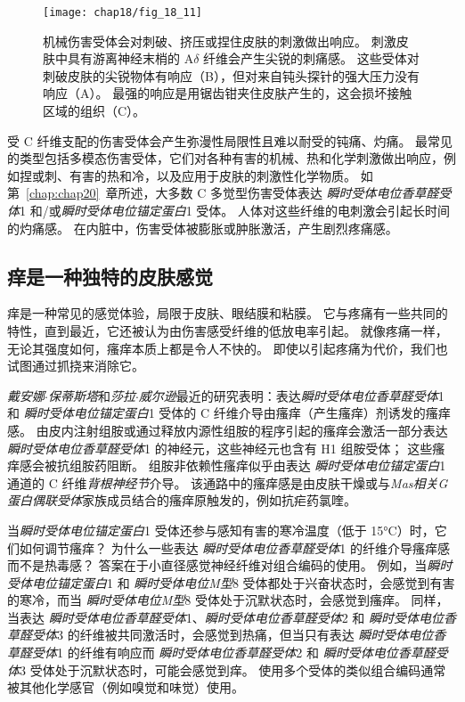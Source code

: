 \begin{figure}[htbp]
	\centering
	\texttt{[image: chap18/fig\_18\_11]}
	\caption{机械伤害受体会对刺破、挤压或捏住皮肤的刺激做出响应。
		刺激皮肤中具有游离神经末梢的 A$\delta$ 纤维会产生尖锐的刺痛感。
		这些受体对刺破皮肤的尖锐物体有响应（B），但对来自钝头探针的强大压力没有响应（A）。
		最强的响应是用锯齿钳夹住皮肤产生的，这会损坏接触区域的组织（C）\cite{perl1968myelinated}。}
	\label{fig:18_11}
\end{figure}


受 C 纤维支配的伤害受体会产生弥漫性局限性且难以耐受的钝痛、灼痛。
最常见的类型包括多模态伤害受体，它们对各种有害的机械、热和化学刺激做出响应，例如捏或刺、有害的热和冷，以及应用于皮肤的刺激性化学物质。
如第~\ref{chap:chap20}~章所述，大多数 C 多觉型伤害受体表达 \textit{瞬时受体电位香草醛受体}1 和/或\textit{瞬时受体电位锚定蛋白}1 受体。
人体对这些纤维的电刺激会引起长时间的灼痛感。
在内脏中，伤害受体被膨胀或肿胀激活，产生剧烈疼痛感。


\subsection{痒是一种独特的皮肤感觉}

痒是一种常见的感觉体验，局限于皮肤、眼结膜和粘膜。 
它与疼痛有一些共同的特性，直到最近，它还被认为由伤害感受纤维的低放电率引起。
就像疼痛一样，无论其强度如何，瘙痒本质上都是令人不快的。
即使以引起疼痛为代价，我们也试图通过抓挠来消除它。


\textit{戴安娜$\cdot$保蒂斯塔}和\textit{莎拉$\cdot$威尔逊}最近的研究表明：表达\textit{瞬时受体电位香草醛受体}1 和 \textit{瞬时受体电位锚定蛋白}1 受体的 C 纤维介导由瘙痒（产生瘙痒）剂诱发的瘙痒感。
由皮内注射组胺或通过释放内源性组胺的程序引起的瘙痒会激活一部分表达 \textit{瞬时受体电位香草醛受体}1 的神经元，这些神经元也含有 H1 组胺受体；
这些瘙痒感会被抗组胺药阻断。
组胺非依赖性瘙痒似乎由表达 \textit{瞬时受体电位锚定蛋白}1 通道的 C 纤维\textit{背根神经节}介导。
该通路中的瘙痒感是由皮肤干燥或与\textit{Mas相关G蛋白偶联受体}家族成员结合的瘙痒原触发的，例如抗疟药氯喹。


当\textit{瞬时受体电位锚定蛋白}1 受体还参与感知有害的寒冷温度（低于 15°C）时，它们如何调节瘙痒？
为什么一些表达 \textit{瞬时受体电位香草醛受体}1 的纤维介导瘙痒感而不是热毒感？
答案在于小直径感觉神经纤维对组合编码的使用。
例如，当\textit{瞬时受体电位锚定蛋白}1 和 \textit{瞬时受体电位M型}8 受体都处于兴奋状态时，会感觉到有害的寒冷，而当 \textit{瞬时受体电位M型}8 受体处于沉默状态时，会感觉到瘙痒。
同样，当表达 \textit{瞬时受体电位香草醛受体}1、\textit{瞬时受体电位香草醛受体}2 和 \textit{瞬时受体电位香草醛受体}3 的纤维被共同激活时，会感觉到热痛，但当只有表达 \textit{瞬时受体电位香草醛受体}1 的纤维有响应而 \textit{瞬时受体电位香草醛受体}2 和 \textit{瞬时受体电位香草醛受体}3 受体处于沉默状态时，可能会感觉到痒。
使用多个受体的类似组合编码通常被其他化学感官（例如嗅觉和味觉）使用。



